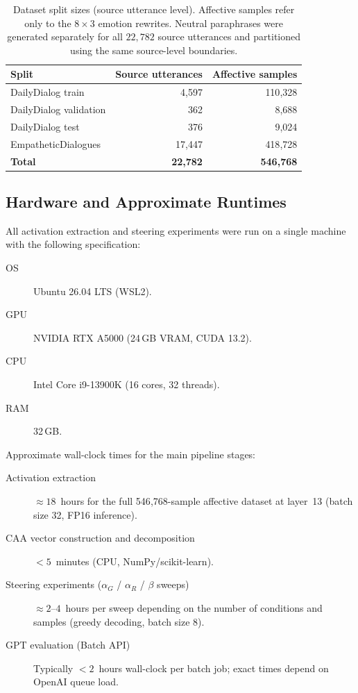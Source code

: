 \begin{table}[htbp]
\centering
\begin{tabular}{lrr}
\hline
\textbf{Split} & \textbf{Source utterances} & \textbf{Affective samples} \\
\hline
DailyDialog train      & 4{,}597 & 110{,}328 \\
DailyDialog validation & 362     &   8{,}688 \\
DailyDialog test       & 376     &   9{,}024 \\
EmpatheticDialogues    & 17{,}447 & 418{,}728 \\
\hline
\textbf{Total} & \textbf{22{,}782} & \textbf{546{,}768} \\
\hline
\end{tabular}
\caption{Dataset split sizes (source utterance level). Affective samples refer only to the $8{\times}3$ emotion rewrites. Neutral paraphrases were generated separately for all $22{,}782$ source utterances and partitioned using the same source-level boundaries.}
\label{tab:dataset_split}
\end{table}

\subsection*{Hardware and Approximate Runtimes}

All activation extraction and steering experiments were run on a single machine
with the following specification:

\begin{description}
  \item[OS] Ubuntu 26.04 LTS (WSL2).
  \item[GPU] NVIDIA RTX A5000 (24\,GB VRAM, CUDA 13.2).
  \item[CPU] Intel Core i9-13900K (16 cores, 32 threads).
  \item[RAM] 32\,GB.
\end{description}

Approximate wall-clock times for the main pipeline stages:

\begin{description}
  \item[Activation extraction] $\approx 18$~hours for the full 546{,}768-sample
    affective dataset at layer~13 (batch size 32, FP16 inference).
  \item[CAA vector construction and decomposition] $<5$~minutes (CPU, NumPy/scikit-learn).
  \item[Steering experiments ($\alpha_G$ / $\alpha_R$ / $\beta$ sweeps)] $\approx
    2$--$4$~hours per sweep depending on the number of conditions and samples
    (greedy decoding, batch size 8).
  \item[GPT evaluation (Batch API)] Typically $<2$~hours wall-clock per batch job;
    exact times depend on OpenAI queue load.
\end{description}

